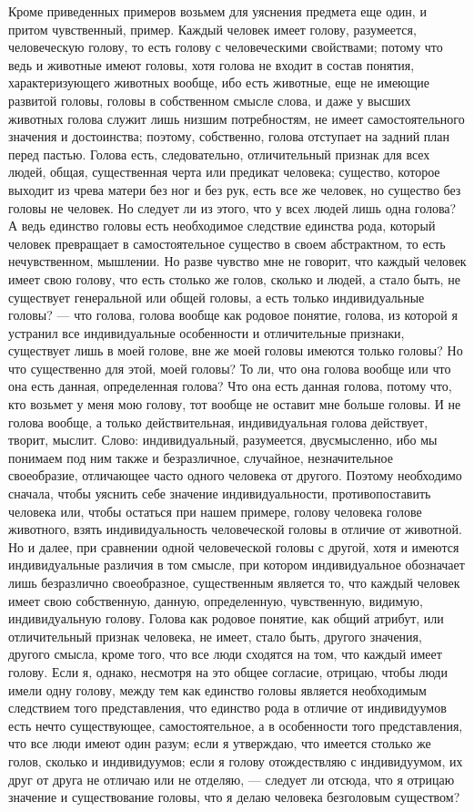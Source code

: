 \documentclass[12pt]{article}
\begin{document}
Кроме приведенных примеров возьмем для уяснения предмета еще один, и притом чувственный, пример. Каждый человек имеет голову, разумеется, человеческую голову, то есть голову с человеческими свойствами; потому что ведь и животные имеют головы, хотя голова не входит в состав понятия, характеризующего животных вообще, ибо есть животные, еще не имеющие развитой головы, головы в собственном смысле слова, и даже у высших животных голова служит лишь низшим потребностям, не имеет самостоятельного значения и достоинства; поэтому, собственно, голова отступает на задний план перед пастью. Голова есть, следовательно, отличительный признак для всех людей, общая, существенная черта или предикат человека; существо, которое выходит из чрева матери без ног и без рук, есть все же человек, но существо без головы не человек. Но следует ли из этого, что у всех людей лишь одна голова? А ведь единство головы есть необходимое следствие единства рода, который человек превращает в самостоятельное существо в своем абстрактном, то есть нечувственном, мышлении. Но разве чувство мне не говорит, что каждый человек имеет свою голову, что есть столько же голов, сколько и людей, а стало быть, не существует генеральной или общей головы, а есть только индивидуальные головы? --- что голова, голова вообще как родовое понятие, голова, из которой я устранил все индивидуальные особенности и отличительные признаки, существует лишь в моей голове, вне же моей головы имеются только головы? Но что существенно для этой, моей головы? То ли, что она голова вообще или что она есть данная, определенная голова? Что она есть данная голова, потому что, кто возьмет у меня мою голову, тот вообще не оставит мне больше головы. И не голова вообще, а только действительная, индивидуальная голова действует, творит, мыслит. Слово: индивидуальный, разумеется, двусмысленно, ибо мы понимаем под ним также и безразличное, случайное, незначительное своеобразие, отличающее часто одного человека от другого. Поэтому необходимо сначала, чтобы уяснить себе значение индивидуальности, противопоставить человека или, чтобы остаться при нашем примере, голову человека голове животного, взять индивидуальность человеческой головы в отличие от животной. Но и далее, при сравнении одной человеческой головы с другой, хотя и имеются индивидуальные различия в том смысле, при котором индивидуальное обозначает лишь безразлично своеобразное, существенным является то, что каждый человек имеет свою собственную, данную, определенную, чувственную, видимую, индивидуальную голову. Голова как родовое понятие, как общий атрибут, или отличительный признак человека, не имеет, стало быть, другого значения, другого смысла, кроме того, что все люди сходятся на том, что каждый имеет голову. Если я, однако, несмотря на это общее согласие, отрицаю, чтобы люди имели одну голову, между тем как единство головы является необходимым следствием того представления, что единство рода в отличие от индивидуумов есть нечто существующее, самостоятельное, а в особенности того представления, что все люди имеют один разум; если я утверждаю, что имеется столько же голов, сколько и индивидуумов; если я голову отождествляю с индивидуумом, их друг от друга не отличаю или не отделяю, --- следует ли отсюда, что я отрицаю значение и существование головы, что я делаю человека безголовым существом? 
\end{document}
